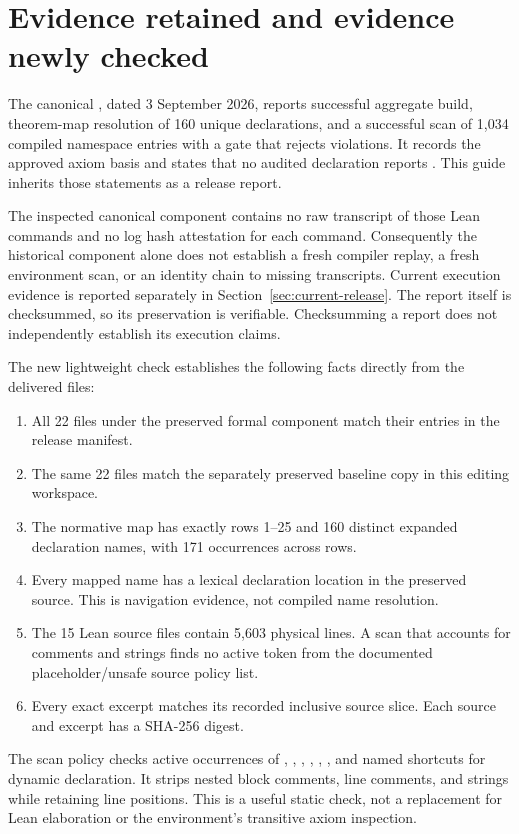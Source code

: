 \section{Evidence retained and evidence newly checked}\label{sec:evidence}

The canonical , dated 3 September 2026, reports successful aggregate build, theorem-map resolution of 160 unique declarations, and a successful scan of 1,034 compiled namespace entries with a gate that rejects violations. It records the approved axiom basis and states that no audited declaration reports . This guide inherits those statements as a release report.

The inspected canonical component contains no raw transcript of those Lean commands and no log hash attestation for each command. Consequently the historical component alone does not establish a fresh compiler replay, a fresh environment scan, or an identity chain to missing transcripts. Current execution evidence is reported separately in Section~\ref{sec:current-release}. The report itself is checksummed, so its preservation is verifiable. Checksumming a report does not independently establish its execution claims.

The new lightweight check establishes the following facts directly from the delivered files:
\begin{enumerate}
\item All 22 files under the preserved formal component match their entries in the release  manifest.
\item The same 22 files match the separately preserved baseline copy in this editing workspace.
\item The normative map has exactly rows 1--25 and 160 distinct expanded declaration names, with 171 occurrences across rows.
\item Every mapped name has a lexical declaration location in the preserved source. This is navigation evidence, not compiled name resolution.
\item The 15 Lean source files contain 5,603 physical lines. A scan that accounts for comments and strings finds no active token from the documented placeholder/unsafe source policy list.
\item Every exact excerpt matches its recorded inclusive source slice. Each source and excerpt has a SHA-256 digest.
\end{enumerate}

The scan policy checks active occurrences of , , , , , , and named shortcuts for dynamic declaration. It strips nested block comments, line comments, and strings while retaining line positions. This is a useful static check, not a replacement for Lean elaboration or the environment's transitive axiom inspection.

